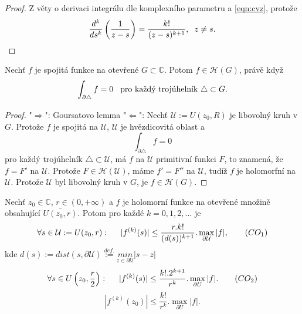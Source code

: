\begin{proof}
Z věty o derivaci integrálu dle komplexního parametru a \cref{eqn:cvz}, protože 
\[\frac{d^k}{ds^k}\left(\frac{1}{z-s}\right)=
\frac{k!}{(z-s)^{k+1}},\hspace{2mm} z\neq{s}.\]
\end{proof}


\begin{theorem}[Morera]
Nechť $f$ je spojitá funkce na otevřené $G\subset{\mathbb{C}}$. Potom $f\in\mathcal{H}(G)$, právě když
\begin{equation}
    \begin{aligned}
\int_{\partial\triangle}{f} =0 \hspace{3mm} \text{pro každý trojúhelník }\triangle\subset{G}.    
    \end{aligned}
    \label{eqn:morera}
\end{equation}
\end{theorem}

\begin{proof}
"$\Rightarrow$": Goursatovo lemma\newline
"$\Leftarrow$": Nechť $\mathcal{U}:=U(z_0,R)$ je libovolný kruh v $G$. Protože $f$ je spojitá na $\mathcal{U}$, $\mathcal{U}$ je hvězdicovitá oblast a 
\[\int_{\partial\triangle}{f} =0\]
pro každý trojúhelník $\triangle\subset\mathcal{U}$, má $f$ na $\mathcal{U}$ primitivní funkci $F$, to znamená, že $f=F'$ na $\mathcal{U}$. Protože $F\in\mathcal{H}(\mathcal{U})$, máme $f'=F''$ na $\mathcal{U}$, tudíž $f$ je holomorfní na $\mathcal{U}$. Protože $\mathcal{U}$ byl libovolný kruh v $G$, je $f\in\mathcal{H}(G)$.
\end{proof}


\begin{theorem}
Nechť $z_0\in\mathbb{C}$, $r\in(0,+\infty)$ a $f$ je holomorní funkce na otevřené množině obsahující $\overline{U(z_0,r)}$. Potom pro každé $k=0,1,2,...$ je 
\begin{equation}
\forall{s\in{\mathcal{U}:=U(z_0,r)}}:\hspace{5mm}|f^{(k)}(s)|\leq\frac{r.k!}{(d(s))^{k+1}}.\max_{\partial\mathcal{U}}{|f|},    
\tag{$CO_1$}
\label{eqn:co1}
\end{equation}
kde $d(s) := dist(s,\partial\mathcal{U})\overset{def.}{:=}\underset{{z\in{\partial{\mathcal{U}}}}}{min}{|s-z|}$
\begin{equation}
\forall{s\in{U\left(z_0,\frac{r}{2}\right)}}:\hspace{5mm}|f^{(k)}(s)|\leq\frac{k!.2^{k+1}}{r^k}.\max_{\partial{U}}{|f|}.
\tag{$CO_2$}
\label{eqn:co2}
\end{equation}
\begin{equation}
    |f^{(k)}(z_0)|\leq\frac{k!}{r^k}.\max_{\partial{U}}{|f|}. 
\tag{$CO_3$}
\label{eqn:co3}
\end{equation}
\end{theorem}

